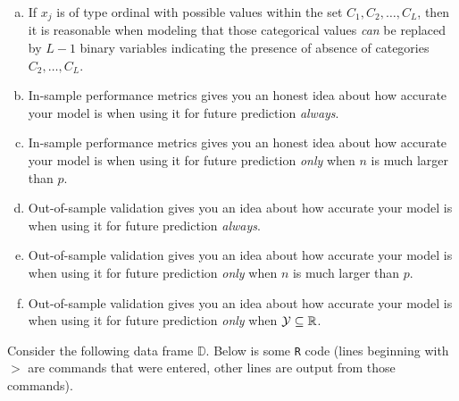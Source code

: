 \documentclass[12pt]{article}
\begin{document}
\begin{enumerate}[(a)]
\begin{enumerate}[(a)]
\item If $x_j$ is of type ordinal with possible values within the set $C_1, C_2, \ldots, C_L$, then it is reasonable when modeling that those categorical values \textit{can} be replaced by $L-1$ binary variables indicating the presence of absence of categories $C_2, \ldots, C_L$.

\item In-sample performance metrics gives you an honest idea about how accurate your model is when using it for future prediction \textit{always}.
\item In-sample performance metrics gives you an honest idea about how accurate your model is when using it for future prediction \textit{only} when $n$ is much larger than $p$.
\item Out-of-sample validation gives you an idea about how accurate your model is when using it for future prediction \textit{always}.
\item Out-of-sample validation gives you an idea about how accurate your model is when using it for future prediction \textit{only} when $n$ is much larger than $p$.
\item Out-of-sample validation gives you an idea about how accurate your model is when using it for future prediction \textit{only} when $\mathcal{Y} \subseteq \mathbb{R}$.
\end{enumerate}

\end{enumerate}
\pagebreak

\problem Consider the following data frame $\mathbb{D}$. Below is some \texttt{R} code (lines beginning with $>$ are commands that were entered, other lines are output from those commands).
\end{document}
